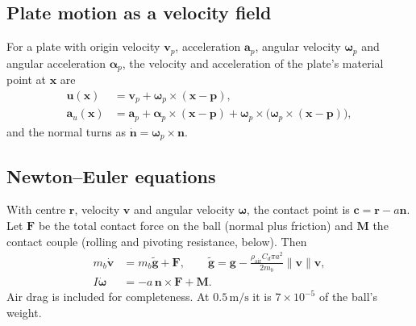 \documentclass[10pt,a4paper]{article}
\newcommand{\un}[1]{\,\mathrm{#1}}
\newcommand{\vect}[1]{\bm{#1}}
\newcommand{\hatn}{\vect{n}}
\begin{document}
\subsection{Plate motion as a velocity field}
For a plate with origin velocity $\vect v_p$, acceleration $\vect a_p$, angular velocity
$\vect\omega_p$ and angular acceleration $\vect\alpha_p$, the velocity and acceleration of the
plate's material point at $\vect x$ are
\begin{align}
  \vect u(\vect x)&=\vect v_p+\vect\omega_p\times(\vect x-\vect p),\\
  \vect a_u(\vect x)&=\vect a_p+\vect\alpha_p\times(\vect x-\vect p)+\vect\omega_p\times\bigl(\vect\omega_p\times(\vect x-\vect p)\bigr),
\end{align}
and the normal turns as $\dot{\hatn}=\vect\omega_p\times\hatn$.

\subsection{Newton--Euler equations}
With centre $\vect r$, velocity $\vect v$ and angular velocity $\vect\omega$, the contact point
is $\vect c=\vect r-a\hatn$. Let $\vect F$ be the total contact force on the ball (normal plus
friction) and $\vect M$ the contact couple (rolling and pivoting resistance, below). Then
\begin{align}
  m_b\dot{\vect v}&=m_b\tilde{\vect g}+\vect F,\qquad
  \tilde{\vect g}=\vect g-\frac{\rho_{\mathrm{air}}C_d\pi a^2}{2m_b}\lVert\vect v\rVert\vect v,\label{eq:newton}\\
  I\dot{\vect\omega}&=-a\,\hatn\times\vect F+\vect M. \label{eq:euler}
\end{align}
Air drag is included for completeness. At $0.5\un{m/s}$ it is $7\times10^{-5}$ of the ball's
weight.
\end{document}
